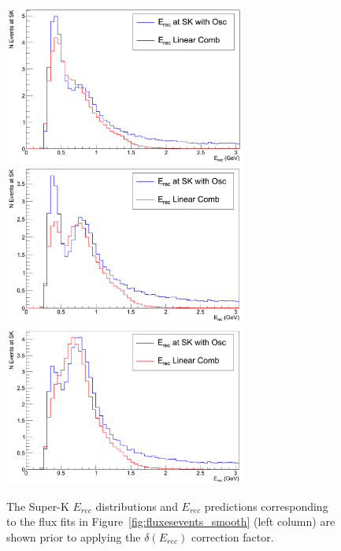 \begin{figure}[htpb]
\begin{center}
      \includegraphics[width=8cm] {figures/dm2_2_56_theta23_0_61_ERec_Comp.png}
      \includegraphics[width=8cm] {figures/dm2_2_41_theta23_0_48_ERec_Comp.png}
      \includegraphics[width=8cm] {figures/dm2_2_26_theta23_0_41_ERec_Comp.png}
\end{center}
\caption{The Super-K $E_{rec}$ distributions and \nuprismlite $E_{rec}$ predictions corresponding to the flux fits in Figure~\ref{fig:fluxesevents_smooth} (left column) are shown prior to applying the $\delta\left(E_{rec}\right)$ correction factor.}
\label{fig:fluxesevents2}
\end{figure}



